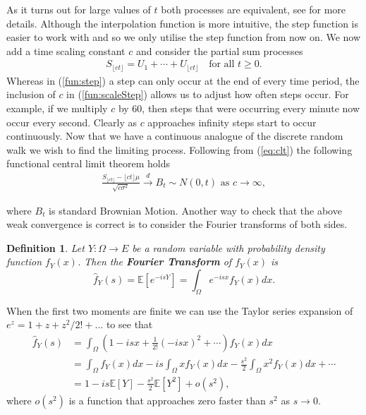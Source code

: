 \documentclass[honours,12pt,twoside, openright]{unswthesis}
\newcommand{\E}{\mathbb{E}}
\newcommand{\1}{\mathbf 1}
\newtheorem{definition}[equation]{Definition}
\numberwithin{equation}{section}
\theoremstyle{definition}
\theoremstyle{remark}
\begin{document}
\noindent As it turns out for large values of $t$ both processes are equivalent, see \cite{Whitt2010} for more details. Although the interpolation function is more intuitive, the step function is easier to work with and so we only utilise the step function from now on. We now add a time scaling constant $c$ and consider the partial sum processes
\begin{align}\label{fun:scaleStep}
	S_{\lfloor ct \rfloor}=U_1+\cdots+U_{\lfloor ct \rfloor}  \quad\textrm{for all } t\geq0.
\end{align}
Whereas in (\ref{fun:step}) a step can only occur at the end of every time period, the inclusion of $c$ in (\ref{fun:scaleStep}) allows us to adjust how often steps occur. For example, if we multiply $c$ by 60, then steps that were occurring every minute now occur every second. Clearly as $c$ approaches infinity steps start to occur continuously. Now that we have a continuous analogue of the discrete random walk we wish to find the limiting process. Following from (\ref{eq:clt}) the following functional central limit theorem holds
\begin{align}\label{eq:BMconv}
	\frac{S_{\lfloor ct\rfloor}-\lfloor ct \rfloor \mu}{\sqrt{c\sigma^2}}\overset{d}{\longrightarrow}B_t\sim N(0,t)\textrm{ as $c\to\infty$},
\end{align}

\noindent where $B_t$ is standard Brownian Motion. Another way to check that the above weak convergence is correct is to consider the Fourier transforms of both sides.\\
\begin{definition}
	Let $Y:\Omega\to E$ be a random variable with probability density function $f_Y(x)$. Then the \textbf{Fourier Transform}  of $f_Y(x)$ is
	\[
		\hat{f}_Y(s)=\E[e^{-isY}]=\int_\Omega e^{-isx} f_Y(x)dx.
	\]
\end{definition}

\noindent When the first two moments are finite we can use the Taylor series expansion of $e^z=1+z+z^2/2!+...$ to see that
\begin{align}
	\hat{f}_Y(s)&=\int_\Omega\left(1-isx+\frac{1}{2!}(-isx)^2+\cdots \right)f_Y(x)dx\\
	&=\int_\Omega f_Y(x)dx - is \int_\Omega x f_Y(x)dx - \frac{s^2}{2}\int_\Omega x^2 f_Y(x)dx +\cdots\\
	&=1-is\E[Y]-\frac{s^2}{2}\E[Y^2] +o(s^2),
\end{align}
\noindent where $o(s^2)$ is a function that approaches zero faster than $s^2$ as $s\to0.$ 
\end{document}
